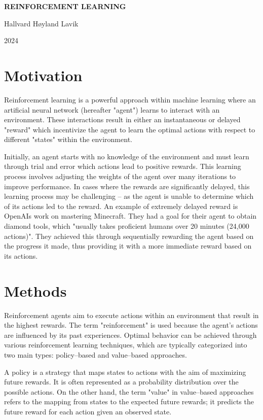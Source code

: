 \documentclass{article}
\let\oldcite\cite
\renewcommand{\cite}[1]{\textbf{\oldcite{#1}}}
\begin{document}
\begin{center}
    \textbf{\LARGE REINFORCEMENT LEARNING}

    \vspace{0.2cm}

    Hallvard Høyland Lavik

    2024

\end{center}

\section*{Motivation}

Reinforcement learning is a powerful approach within machine learning where an artificial neural network (hereafter "agent") learns to interact with an environment. These interactions result in either an instantaneous or delayed "reward" which incentivize the agent to learn the optimal actions with respect to different "states" within the environment.

Initially, an agent starts with no knowledge of the environment and must learn through trial and error which actions lead to positive rewards. This learning process involves adjusting the weights of the agent over many iterations to improve performance. In cases where the rewards are significantly delayed, this learning process may be challenging – as the agent is unable to determine which of its actions led to the reward. An example of extremely delayed reward is OpenAIs work on mastering Minecraft. They had a goal for their agent to obtain diamond tools, which "usually takes proficient humans over 20 minutes (24,000 actions)". They achieved this through sequentially rewarding the agent based on the progress it made, thus providing it with a more immediate reward based on its actions. \cite{Minecraft}

\section*{Methods}

Reinforcement agents aim to execute actions within an environment that result in the highest rewards. The term "reinforcement" is used because the agent's actions are influenced by its past experiences. Optimal behavior can be achieved through various reinforcement learning techniques, which are typically categorized into two main types: policy–based and value–based approaches.

A policy is a strategy that maps states to actions with the aim of maximizing future rewards. It is often represented as a probability distribution over the possible actions. On the other hand, the term "value" in value–based approaches refers to the mapping from states to the expected future rewards; it predicts the future reward for each action given an observed state.
\end{document}
